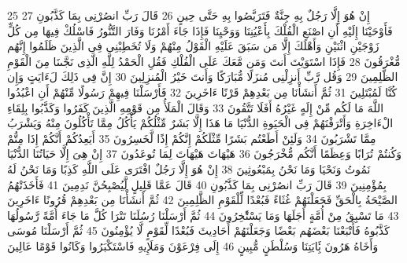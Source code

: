 \documentclass[20pt,a4paper]{article}
\begin{document}
{\tiny\colorbox{cl_aya}{25}} إِنْ هُوَ إِلَّا رَجُلٌ بِهِ جِنَّةٌ فَتَرَبَّصُوا بِهِ حَتَّى حِينٍ
{\tiny\colorbox{cl_aya}{26}} قَالَ رَبِّ انصُرْنِى بِمَا كَذَّبُونِ
{\tiny\colorbox{cl_aya}{27}} فَأَوْحَيْنَا إِلَيْهِ أَنِ اصْنَعِ الْفُلْكَ بِأَعْيُنِنَا وَوَحْيِنَا فَإِذَا جَاءَ أَمْرُنَا وَفَارَ التَّنُّورُ فَاسْلُكْ فِيهَا مِن كُلٍّ زَوْجَيْنِ اثْنَيْنِ وَأَهْلَكَ إِلَّا مَن سَبَقَ عَلَيْهِ الْقَوْلُ مِنْهُمْ وَلَا تُخَطِبْنِى فِى الَّذِينَ ظَلَمُوا إِنَّهُم مُّغْرَقُونَ
{\tiny\colorbox{cl_aya}{28}} فَإِذَا اسْتَوَيْتَ أَنتَ وَمَن مَّعَكَ عَلَى الْفُلْكِ فَقُلِ الْحَمْدُ لِلَّهِ الَّذِى نَجَّىنَا مِنَ الْقَوْمِ الظَّلِمِينَ
{\tiny\colorbox{cl_aya}{29}} وَقُل رَّبِّ أَنزِلْنِى مُنزَلًا مُّبَارَكًا وَأَنتَ خَيْرُ الْمُنزِلِينَ
{\tiny\colorbox{cl_aya}{30}} إِنَّ فِى ذَلِكَ لَءَايَتٍ وَإِن كُنَّا لَمُبْتَلِينَ
{\tiny\colorbox{cl_aya}{31}} ثُمَّ أَنشَأْنَا مِن بَعْدِهِمْ قَرْنًا ءَاخَرِينَ
{\tiny\colorbox{cl_aya}{32}} فَأَرْسَلْنَا فِيهِمْ رَسُولًا مِّنْهُمْ أَنِ اعْبُدُوا اللَّهَ مَا لَكُم مِّنْ إِلَهٍ غَيْرُهُ أَفَلَا تَتَّقُونَ
{\tiny\colorbox{cl_aya}{33}} وَقَالَ الْمَلَأُ مِن قَوْمِهِ الَّذِينَ كَفَرُوا وَكَذَّبُوا بِلِقَاءِ الْءَاخِرَةِ وَأَتْرَفْنَهُمْ فِى الْحَيَوةِ الدُّنْيَا مَا هَذَا إِلَّا بَشَرٌ مِّثْلُكُمْ يَأْكُلُ مِمَّا تَأْكُلُونَ مِنْهُ وَيَشْرَبُ مِمَّا تَشْرَبُونَ
{\tiny\colorbox{cl_aya}{34}} وَلَئِنْ أَطَعْتُم بَشَرًا مِّثْلَكُمْ إِنَّكُمْ إِذًا لَّخَسِرُونَ
{\tiny\colorbox{cl_aya}{35}} أَيَعِدُكُمْ أَنَّكُمْ إِذَا مِتُّمْ وَكُنتُمْ تُرَابًا وَعِظَمًا أَنَّكُم مُّخْرَجُونَ
{\tiny\colorbox{cl_aya}{36}} هَيْهَاتَ هَيْهَاتَ لِمَا تُوعَدُونَ
{\tiny\colorbox{cl_aya}{37}} إِنْ هِىَ إِلَّا حَيَاتُنَا الدُّنْيَا نَمُوتُ وَنَحْيَا وَمَا نَحْنُ بِمَبْعُوثِينَ
{\tiny\colorbox{cl_aya}{38}} إِنْ هُوَ إِلَّا رَجُلٌ افْتَرَى عَلَى اللَّهِ كَذِبًا وَمَا نَحْنُ لَهُ بِمُؤْمِنِينَ
{\tiny\colorbox{cl_aya}{39}} قَالَ رَبِّ انصُرْنِى بِمَا كَذَّبُونِ
{\tiny\colorbox{cl_aya}{40}} قَالَ عَمَّا قَلِيلٍ لَّيُصْبِحُنَّ نَدِمِينَ
{\tiny\colorbox{cl_aya}{41}} فَأَخَذَتْهُمُ الصَّيْحَةُ بِالْحَقِّ فَجَعَلْنَهُمْ غُثَاءً فَبُعْدًا لِّلْقَوْمِ الظَّلِمِينَ
{\tiny\colorbox{cl_aya}{42}} ثُمَّ أَنشَأْنَا مِن بَعْدِهِمْ قُرُونًا ءَاخَرِينَ
{\tiny\colorbox{cl_aya}{43}} مَا تَسْبِقُ مِنْ أُمَّةٍ أَجَلَهَا وَمَا يَسْتَْٔخِرُونَ
{\tiny\colorbox{cl_aya}{44}} ثُمَّ أَرْسَلْنَا رُسُلَنَا تَتْرَا كُلَّ مَا جَاءَ أُمَّةً رَّسُولُهَا كَذَّبُوهُ فَأَتْبَعْنَا بَعْضَهُم بَعْضًا وَجَعَلْنَهُمْ أَحَادِيثَ فَبُعْدًا لِّقَوْمٍ لَّا يُؤْمِنُونَ
{\tiny\colorbox{cl_aya}{45}} ثُمَّ أَرْسَلْنَا مُوسَى وَأَخَاهُ هَرُونَ بَِٔايَتِنَا وَسُلْطَنٍ مُّبِينٍ
{\tiny\colorbox{cl_aya}{46}} إِلَى فِرْعَوْنَ وَمَلَإِيهِ فَاسْتَكْبَرُوا وَكَانُوا قَوْمًا عَالِينَ
\end{document}
